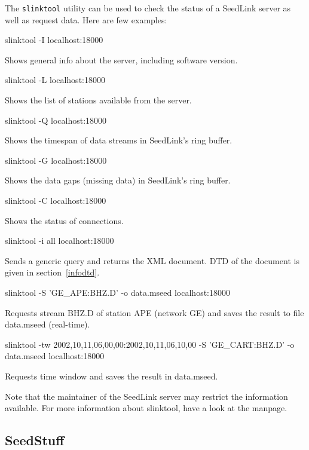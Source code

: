\documentclass[11pt,a4paper,titlepage]{article}
\begin{document}
The \verb+slinktool+ utility can be used to check the status of a SeedLink
server as well as request data. Here are few examples:
\begin{interface}
\item slinktool -I localhost:18000

Shows general info about the server, including software version.

\item slinktool -L localhost:18000

Shows the list of stations available from the server.

\item slinktool -Q localhost:18000

Shows the timespan of data streams in SeedLink's ring buffer.

\item slinktool -G localhost:18000

Shows the data gaps (missing data) in SeedLink's ring buffer.

\item slinktool -C localhost:18000

Shows the status of connections.

\item slinktool -i all localhost:18000

Sends a generic query and returns the XML document. DTD of the document is
given in section~\ref{infodtd}.

\item slinktool -S 'GE_APE:BHZ.D' -o data.mseed localhost:18000

Requests stream BHZ.D of station APE (network GE) and saves the result to
file data.mseed (real-time).

\item slinktool -tw 2002,10,11,06,00,00:2002,10,11,06,10,00 -S
'GE_CART:BHZ.D' -o data.mseed localhost:18000

Requests time window and saves the result in data.mseed.
\end{interface}

Note that the maintainer of the SeedLink server may restrict the
information available. For more information about slinktool, have a
look at the manpage.


\subsection{SeedStuff}
\end{document}
